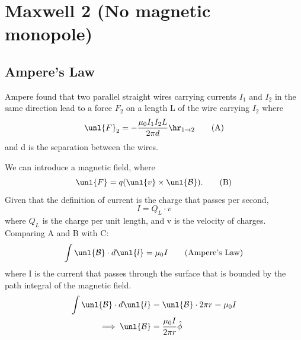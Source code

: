 \documentclass[a4paper, 11pt, normalem]{report}
\renewcommand\B{\mathcal{B}}
\newcommand\uB{\unl{\B}}
\begin{document}
\section{Maxwell 2 (No magnetic monopole)}
\subsection{Ampere's Law}
Ampere found that two parallel straight wires carrying currents $I_1$ and $I_2$ in the same direction lead to a force $F_2$ on a length L of the wire carrying $I_2$ where
\begin{equation}
    \unl{F}_2 = -\frac{\mu_0 I_1 I_2 L}{2\pi d}\hr_{1\to2} \tag{A}
\end{equation}
and d is the separation between the wires.

We can introduce a magnetic field, where
\begin{equation}
    \unl{F} = q(\unl{v}\times\uB). \tag{B}
\end{equation}
Given that the definition of current is the charge that passes per second,
\begin{equation}
    I = Q_L\cdot v \tag{C}
\end{equation}
where $Q_L$ is the charge per unit length, and v is the velocity of charges. \\
Comparing A and B with C:
\begin{equation}
    \int \uB \cdot d\unl{l} = \mu_0 I \tag{Ampere's Law}
\end{equation}
where I is the current that passes through the surface that is bounded by the path integral of the magnetic field.
\begin{align}
    \int \uB\cdot d\unl{l} &= \uB\cdot2\pi r = \mu_0 I \\
    \implies \uB &= \frac{\mu_0 I}{2\pi r}\hat{\phi} \\
\end{align}
\end{document}
